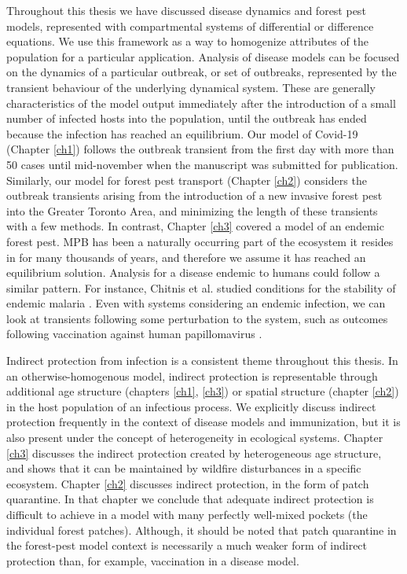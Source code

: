 Throughout this thesis we have discussed disease dynamics and forest pest models, represented with compartmental systems of differential or difference equations. We use this framework as a way to homogenize attributes of the population for a particular application. Analysis of disease models can be focused on the dynamics of a particular outbreak, or set of outbreaks, represented by the transient behaviour of the underlying dynamical system. These are generally characteristics of the model output immediately after the introduction of a small number of infected hosts into the population, until the outbreak has ended because the infection has reached an equilibrium. Our model of Covid-19 (Chapter \ref{ch1}) follows the outbreak transient from the first day with more than 50 cases until mid-november when the manuscript was submitted for publication. Similarly, our model for forest pest transport (Chapter \ref{ch2}) considers the outbreak transients arising from the introduction of a new invasive forest pest into the Greater Toronto Area, and minimizing the length of these transients with a few methods. In contrast, Chapter \ref{ch3} covered a model of an endemic forest pest. MPB has been a naturally occurring part of the ecosystem it resides in for many thousands of years, and therefore we assume it has reached an equilibrium solution. Analysis for a disease endemic to humans could follow a similar pattern. For instance, Chitnis et al. studied conditions for the stability of endemic malaria \cite{chitnis2006bifurcation}. Even with systems considering an endemic infection, we can look at transients following some perturbation to the system, such as outcomes following vaccination against human papillomavirus \cite{lee2012mathematical}. 

Indirect protection from infection is a consistent theme throughout this thesis. In an otherwise-homogenous model, indirect protection is representable through additional age structure (chapters \ref{ch1}, \ref{ch3}) or spatial structure (chapter \ref{ch2}) in the host population of an infectious process. We explicitly discuss indirect protection frequently in the context of disease models and immunization, but it is also present under the concept of heterogeneity in ecological systems. Chapter \ref{ch3} discusses the indirect protection created by heterogeneous age structure, and shows that it can be maintained by  wildfire disturbances in a specific ecosystem. Chapter \ref{ch2} discusses indirect protection, in the form of patch quarantine. In that chapter we conclude that adequate indirect protection is difficult to achieve in a model with many perfectly well-mixed pockets (the individual forest patches). Although, it should be noted that patch quarantine in the forest-pest model context is necessarily a much weaker form of indirect protection than, for example, vaccination in a disease model.


